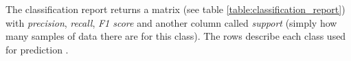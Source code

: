 The classification report returns a matrix (see table \ref{table:classification_report}) with \textit{precision}, \textit{recall}, \textit{F1 score} and another column called \textit{support} (simply how many samples of data there are for this class). The rows describe each class used for prediction \cite{sklearn_classification_report}.